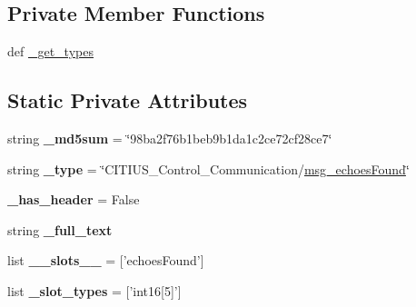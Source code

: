 \subsection*{\-Private \-Member \-Functions}
\begin{DoxyCompactItemize}
\item 
def \hyperlink{class_c_i_t_i_u_s___control___communication_1_1msg_1_1__msg__echoes_found_1_1msg__echoes_found_ad9c82564c38cb5cd00523cae9bd28206}{\-\_\-get\-\_\-types}
\end{DoxyCompactItemize}
\subsection*{\-Static \-Private \-Attributes}
\begin{DoxyCompactItemize}
\item 
\hypertarget{class_c_i_t_i_u_s___control___communication_1_1msg_1_1__msg__echoes_found_1_1msg__echoes_found_a8b5ec62555041b7640a6d0ac6cd80a04}{string {\bfseries \-\_\-md5sum} = \char`\"{}98ba2f76b1beb9b1da1c2ce72cf28ce7\char`\"{}}\label{class_c_i_t_i_u_s___control___communication_1_1msg_1_1__msg__echoes_found_1_1msg__echoes_found_a8b5ec62555041b7640a6d0ac6cd80a04}

\item 
\hypertarget{class_c_i_t_i_u_s___control___communication_1_1msg_1_1__msg__echoes_found_1_1msg__echoes_found_ac84fa08e881d43bd99b83c1471945ac9}{string {\bfseries \-\_\-type} = \char`\"{}\-C\-I\-T\-I\-U\-S\-\_\-\-Control\-\_\-\-Communication/\hyperlink{class_c_i_t_i_u_s___control___communication_1_1msg_1_1__msg__echoes_found_1_1msg__echoes_found}{msg\-\_\-echoes\-Found}\char`\"{}}\label{class_c_i_t_i_u_s___control___communication_1_1msg_1_1__msg__echoes_found_1_1msg__echoes_found_ac84fa08e881d43bd99b83c1471945ac9}

\item 
\hypertarget{class_c_i_t_i_u_s___control___communication_1_1msg_1_1__msg__echoes_found_1_1msg__echoes_found_a94a4a7899448f7055a5ef7b0928e70ef}{{\bfseries \-\_\-has\-\_\-header} = \-False}\label{class_c_i_t_i_u_s___control___communication_1_1msg_1_1__msg__echoes_found_1_1msg__echoes_found_a94a4a7899448f7055a5ef7b0928e70ef}

\item 
string {\bfseries \-\_\-full\-\_\-text}
\item 
\hypertarget{class_c_i_t_i_u_s___control___communication_1_1msg_1_1__msg__echoes_found_1_1msg__echoes_found_aac54acb804c59a8a46748feaa3de6f45}{list {\bfseries \-\_\-\-\_\-slots\-\_\-\-\_\-} = \mbox{[}'echoes\-Found'\mbox{]}}\label{class_c_i_t_i_u_s___control___communication_1_1msg_1_1__msg__echoes_found_1_1msg__echoes_found_aac54acb804c59a8a46748feaa3de6f45}

\item 
\hypertarget{class_c_i_t_i_u_s___control___communication_1_1msg_1_1__msg__echoes_found_1_1msg__echoes_found_a7377381bf0c50bbf0fdecedc8c6085df}{list {\bfseries \-\_\-slot\-\_\-types} = \mbox{[}'int16\mbox{[}5\mbox{]}'\mbox{]}}\label{class_c_i_t_i_u_s___control___communication_1_1msg_1_1__msg__echoes_found_1_1msg__echoes_found_a7377381bf0c50bbf0fdecedc8c6085df}

\end{DoxyCompactItemize}


